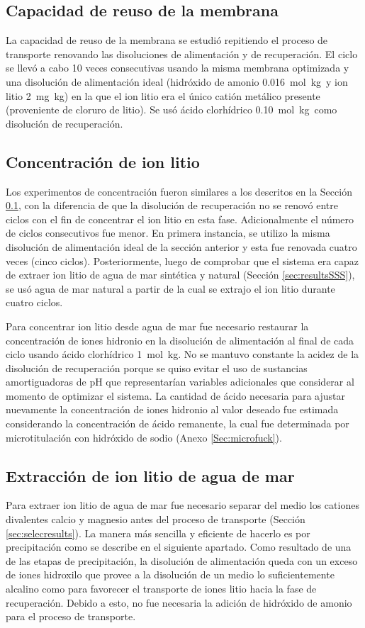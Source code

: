 \subsection{Capacidad de reuso de la membrana}\label{sec:reuseex}
La capacidad de reuso de la membrana se estudió repitiendo el proceso de transporte renovando las disoluciones de alimentación y de recuperación. El ciclo se llevó a cabo 10 veces consecutivas usando la misma membrana optimizada y una disolución de alimentación ideal (hidróxido de amonio 0.016~mol~kg\mnn\ y ion litio 2~mg~kg\mnn) en la que el ion litio era el único catión metálico presente (proveniente de cloruro de litio). Se usó ácido clorhídrico 0.10~mol~kg\mnn\ como disolución de recuperación.

\subsection{Concentración de ion litio}\label{ss:concentracion}
Los experimentos de concentración fueron similares a los descritos en la Sección \ref{sec:reuseex}, con la diferencia de que la disolución de recuperación no se renovó entre ciclos con el fin de concentrar el ion litio en esta fase. Adicionalmente el número de ciclos consecutivos fue menor. En primera instancia, se utilizo la misma disolución de alimentación ideal de la sección anterior y esta fue renovada cuatro veces (cinco ciclos). Posteriormente, luego de comprobar que el sistema era capaz de extraer ion litio de agua de mar sintética y natural (Sección \ref{sec:resultsSSS}), se usó agua de mar natural a partir de la cual se extrajo el ion litio durante cuatro ciclos. 

Para concentrar ion litio desde agua de mar fue necesario restaurar la concentración de iones hidronio en la disolución de alimentación al final de cada ciclo usando ácido clorhídrico 1~mol~kg\mnn. No se mantuvo constante la acidez de la disolución de recuperación porque se quiso evitar el uso de sustancias amortiguadoras de pH que representarían variables adicionales que considerar al momento de optimizar el sistema. La cantidad de ácido necesaria para ajustar nuevamente la concentración de iones hidronio al valor deseado fue estimada considerando la concentración de ácido remanente, la cual fue determinada por microtitulación con hidróxido de sodio (Anexo \ref{Sec:microfuck}).

\subsection{Extracción de ion litio de agua de mar}
Para extraer ion litio de agua de mar fue necesario separar del medio los cationes divalentes calcio y magnesio antes del proceso de transporte (Sección \ref{sec:selecresults}). La manera más sencilla y eficiente de hacerlo es por precipitación como se describe en el siguiente apartado. Como resultado de una de las etapas de precipitación, la disolución de alimentación queda con un exceso de iones hidroxilo que provee a la disolución de un medio lo suficientemente alcalino como para favorecer el transporte de iones litio hacia la fase de recuperación. Debido a esto, no fue necesaria la adición de hidróxido de amonio para el proceso de transporte.

